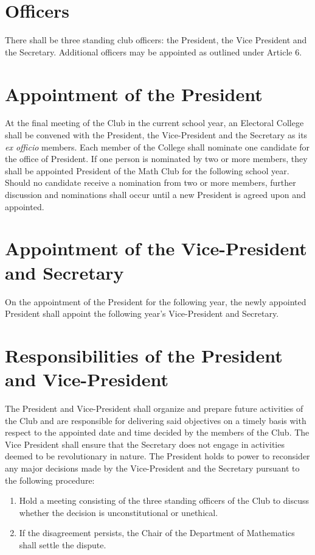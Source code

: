 \documentclass[12pt, letterpaper]{article}
\begin{document}
\section{Officers}
There shall be three standing club officers: the President, the Vice President and the Secretary. Additional officers may be appointed as outlined under Article 6.

\section{Appointment of the President}
At the final meeting of the Club in the current school year, an Electoral College shall be convened with the President, the Vice-President and the Secretary as its \textit{ex officio} members. Each member of the College shall nominate one candidate for the office of President. If one person is nominated by two or more members, they shall be appointed President of the Math Club for the following school year. Should no candidate receive a nomination from two or more members, further discussion and nominations shall occur until a new President is agreed upon and appointed.

\section{Appointment of the Vice-President and Secretary}
On the appointment of the President for the following year, the newly appointed President shall appoint the following year’s Vice-President and Secretary.

\section{Responsibilities of the President and Vice-President}
The President and Vice-President shall organize and prepare future activities of the Club and are responsible for delivering said objectives on a timely basis with respect to the appointed date and time decided by the members of the Club. The Vice President shall ensure that the Secretary does not engage in activities deemed to be revolutionary in nature. The President holds to power to reconsider any major decisions made by the Vice-President and the Secretary pursuant to the following procedure:
\begin{enumerate}
	\item Hold a meeting consisting of the three standing officers of the Club to discuss whether the decision is unconstitutional or unethical.
	\item If the disagreement persists, the Chair of the Department of Mathematics shall settle the dispute.
\end{enumerate}
\end{document}
